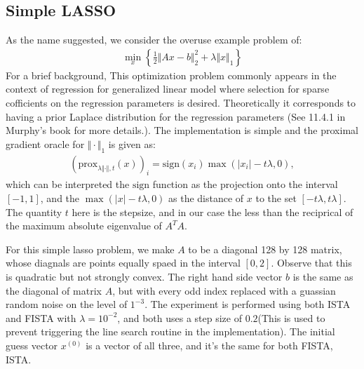 \documentclass[]{article}
\theoremstyle{definition}
\begin{document}
    \subsection*{Simple LASSO}
        As the name suggested, we consider the overuse example problem of: 
        \begin{align*}
            \min_{x}\left\lbrace
                \frac{1}{2}\Vert Ax - b\Vert^2_2 + \lambda\Vert x\Vert_1    
            \right\rbrace
        \end{align*}
        For a brief background, This optimization problem commonly appears in the context of regression for generalized linear model where selection for sparse cofficients on the regression parameters is desired. Theoretically it corresponds to having a prior Laplace distribution for the regression parameters (See 11.4.1 in Murphy's\cite{book:ml_prob_murphy} book for more details.). The implementation is simple and the proximal gradient oracle for $\Vert \cdot \Vert_1$ is given as: 
        \begin{align*}
           (\text{prox}_{\lambda\Vert \cdot \Vert, t}(x))_i
           = 
           \text{sign}(x_i)\max(|x_i| - t\lambda, 0), 
        \end{align*}
        which can be interpreted the $\text{sign}$ function as the projection onto the interval $[-1, 1]$, and the $\max(|x| - t\lambda, 0)$ as the distance of $x$ to the set $[-t\lambda, t\lambda]$. The quantity $t$ here is the stepsize, and in our case the less than the reciprical of the maximum absolute eigenvalue of $A^TA$. 
        \par
        For this simple lasso problem, we make $A$ to be a diagonal 128 by 128 matrix, whose diagnals are points equally spaed in the interval $[0, 2]$. Observe that this is quadratic but not strongly convex. The right hand side vector $b$ is the same as the diagonal of matrix $A$, but with every odd index replaced with a guassian random noise on the level of $1^{-3}$. The experiment is performed using both ISTA and FISTA with $\lambda = 10^{-2}$, and both uses a step size of $0.2$(This is used to prevent triggering the line search routine in the implementation). The initial guess vector $x^{(0)}$ is a vector of all three, and it's the same for both FISTA, ISTA. 
        \par
\end{document}
